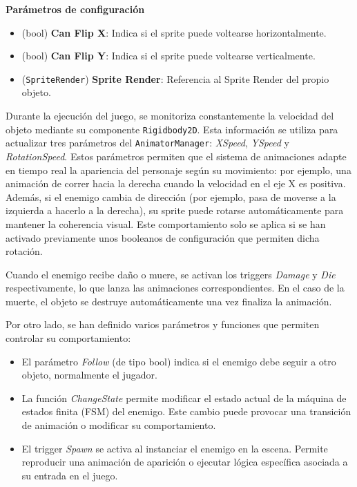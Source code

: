 \textbf{Parámetros de configuración}
\begin{itemize}
	\item (bool) \textbf{Can Flip X}: Indica si el sprite puede voltearse horizontalmente.
	\item (bool) \textbf{Can Flip Y}: Indica si el sprite puede voltearse verticalmente. 
	\item (\texttt{SpriteRender}) \textbf{Sprite Render}: Referencia al Sprite Render del propio objeto.
\end{itemize}

Durante la ejecución del juego, se monitoriza constantemente la velocidad del objeto mediante su componente \texttt{Rigidbody2D}. Esta información se utiliza para actualizar tres parámetros del \texttt{AnimatorManager}: \textit{XSpeed}, \textit{YSpeed} y \textit{RotationSpeed}. Estos parámetros permiten que el sistema de animaciones adapte en tiempo real la apariencia del personaje según su movimiento: por ejemplo, una animación de correr hacia la derecha cuando la velocidad en el eje X es positiva. Además, si el enemigo cambia de dirección (por ejemplo, pasa de moverse a la izquierda a hacerlo a la derecha), su sprite puede rotarse automáticamente para mantener la coherencia visual. Este comportamiento solo se aplica si se han activado previamente unos booleanos de configuración que permiten dicha rotación.

Cuando el enemigo recibe daño o muere, se activan los triggers \textit{Damage} y \textit{Die} respectivamente, lo que lanza las animaciones correspondientes. En el caso de la muerte, el objeto se destruye automáticamente una vez finaliza la animación. 

Por otro lado, se han definido varios parámetros y funciones que permiten controlar su comportamiento:
\begin{itemize}
	\item El parámetro \textit{Follow} (de tipo bool) indica si el enemigo debe seguir a otro objeto, normalmente el jugador.
	\item La función \textit{ChangeState} permite modificar el estado actual de la máquina de estados finita (FSM) del enemigo. Este cambio puede provocar una transición de animación o modificar su comportamiento.
	\item El trigger \textit{Spawn} se activa al instanciar el enemigo en la escena. Permite reproducir una animación de aparición o ejecutar lógica específica asociada a su entrada en el juego.
\end{itemize}

